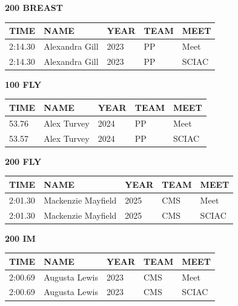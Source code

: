 \begin{table}[H]
\centering
\begin{minipage}[t]{0.48\textwidth}
\centering
\textbf{200 BREAST}\\[0.1cm]
\begin{tabular}{@{}p{1.8cm}p{2.8cm}p{1.2cm}p{1.4cm}p{1.4cm}@{}}
\hline
    \textbf{TIME} & \textbf{NAME} & \textbf{YEAR} & \textbf{TEAM} & \textbf{MEET} \\
\hline
    2:14.30 & Alexandra Gill & 2023 & PP & Meet \\
    2:14.30 & Alexandra Gill & 2023 & PP & SCIAC \\
\hline
\end{tabular}
\end{minipage}\hfill
\begin{minipage}[t]{0.48\textwidth}
\centering
\textbf{100 FLY}\\[0.1cm]
\begin{tabular}{@{}p{1.8cm}p{2.8cm}p{1.2cm}p{1.4cm}p{1.4cm}@{}}
\hline
    \textbf{TIME} & \textbf{NAME} & \textbf{YEAR} & \textbf{TEAM} & \textbf{MEET} \\
\hline
    53.76 & Alex Turvey & 2024 & PP & Meet \\
    53.57 & Alex Turvey & 2024 & PP & SCIAC \\
\hline
\end{tabular}
\end{minipage}
\end{table}

\begin{table}[H]
\centering
\begin{minipage}[t]{0.48\textwidth}
\centering
\textbf{200 FLY}\\[0.1cm]
\begin{tabular}{@{}p{1.8cm}p{2.8cm}p{1.2cm}p{1.4cm}p{1.4cm}@{}}
\hline
    \textbf{TIME} & \textbf{NAME} & \textbf{YEAR} & \textbf{TEAM} & \textbf{MEET} \\
\hline
    2:01.30 & Mackenzie Mayfield & 2025 & CMS & Meet \\
    2:01.30 & Mackenzie Mayfield & 2025 & CMS & SCIAC \\
\hline
\end{tabular}
\end{minipage}\hfill
\begin{minipage}[t]{0.48\textwidth}
\centering
\textbf{200 IM}\\[0.1cm]
\begin{tabular}{@{}p{1.8cm}p{2.8cm}p{1.2cm}p{1.4cm}p{1.4cm}@{}}
\hline
    \textbf{TIME} & \textbf{NAME} & \textbf{YEAR} & \textbf{TEAM} & \textbf{MEET} \\
\hline
    2:00.69 & Augusta Lewis & 2023 & CMS & Meet \\
    2:00.69 & Augusta Lewis & 2023 & CMS & SCIAC \\
\hline
\end{tabular}
\end{minipage}
\end{table}

